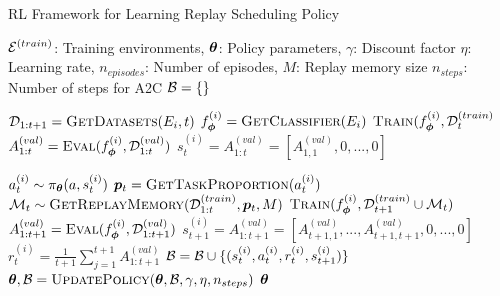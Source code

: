 \begin{algorithm}[t]
\footnotesize
\caption{RL Framework for Learning Replay Scheduling Policy}
\label{alg:rl_framework_for_learning_replay_scheduling_policy}
\begin{algorithmic}[1]
\Require ${\mathcal{E}}^{(train)}$: Training environments, ${\bm{\theta}}$: Policy parameters, $\gamma$: Discount factor
\Require $\eta$: Learning rate, $n_{episodes}$: Number of episodes, $M$: Replay memory size
\Require $n_{steps}$: Number of steps for A2C
\State ${\mathcal{B}} = \{\}$ 

        
            \State ${\mathcal{D}}_{1:t+1} = \textsc{GetDatasets}(E_i, t)$ 
            \State $f_{{\bm{\phi}}}^{(i)} = \textsc{GetClassifier}(E_i)$ 
                \State $\textsc{Train}(f_{{\bm{\phi}}}^{(i)}, {\mathcal{D}}_{t}^{(train)}$ 
                \State $A_{1:t}^{(val)} = \textsc{Eval}(f_{{\bm{\phi}}}^{(i)}, {\mathcal{D}}_{1:t}^{(val)})$ 
                \State $s_{t}^{(i)} = A_{1:t}^{(val)} = [A_{1, 1}^{(val)}, 0, ..., 0]$ 
            \EndIf 

            \State $a_t^{(i)} \sim \pi_{{\bm{\theta}}}(a, s_t^{(i)})$ 
            \State ${\bm{p}}_t = \textsc{GetTaskProportion}(a_t^{(i)})$ %
            \State ${\mathcal{M}}_t \sim \textsc{GetReplayMemory}({\mathcal{D}}_{1:t}^{(train)}, {\bm{p}}_t, M)$ %
            \State $\textsc{Train}(f_{{\bm{\phi}}}^{(i)}, {\mathcal{D}}_{t+1}^{(train)} \cup {\mathcal{M}}_t)$ 
            \State $A_{1:t+1}^{(val)} = \textsc{Eval}(f_{{\bm{\phi}}}^{(i)}, {\mathcal{D}}_{1:t+1}^{(val)})$ 
            \State $s_{t+1}^{(i)} = A_{1:t+1}^{(val)} = [A_{t+1, 1}^{(val)}, ..., A_{t+1, t+1}^{(val)}, 0, ..., 0]$ 
            \State $r_{t}^{(i)} = \frac{1}{t+1}\sum_{j=1}^{t+1} A_{1:t+1}^{(val)}$ 
            \State ${\mathcal{B}} = {\mathcal{B}} \cup \{(s_{t}^{(i)}, a_{t}^{(i)}, r_{t}^{(i)}, s_{t+1}^{(i)})\}$ 
                \State ${\bm{\theta}}, {\mathcal{B}} = \textsc{UpdatePolicy}({\bm{\theta}}, {\mathcal{B}}, \gamma, \eta, n_{steps})$ 
            \EndIf 
        \EndFor
\EndFor
\EndFor 
\State \Return ${\bm{\theta}}$ 


\end{algorithmic}
\end{algorithm}

